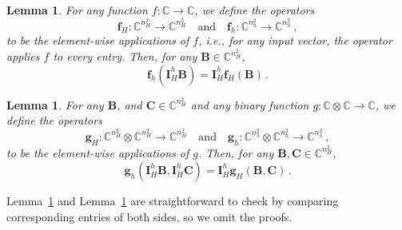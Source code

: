 \documentclass{article}
\numberwithin{equation}{section}
\newtheorem{lemma}[theorem]{Lemma}     %
\begin{document}
\begin{lemma}\label{lem:unary}
    For any function $f:\mathbb{C}\to\mathbb{C}$, we define the operators
\begin{equation*}
    \bm{f}_H:\mathbb{C}^{n_H^2}\to\mathbb{C}^{n_H^2}\quad\text{and}\quad \bm{f}_h:\mathbb{C}^{n_h^2}\to\mathbb{C}^{n_h^2}\,,
\end{equation*}
to be the element-wise applications of $f$, i.e., for any input vector, the operator applies $f$ to every entry. Then, for any $\bm{B}\in\mathbb{C}^{n_H^2}$,
\begin{equation*}
    \bm{f}_h\left(\bm{I}_H^h\bm{B}\right)= \bm{I}_H^h\bm{f}_H(\bm{B})\,.
\end{equation*}
\end{lemma}

\begin{lemma}\label{lem:binary}
    For any $\bm{B}$, and $\bm{C}\in\mathbb{C}^{n_H^2}$ and any binary function $g:\mathbb{C}\otimes\mathbb{C}\to\mathbb{C}$, we define the operators
\begin{equation*}
    \bm{g}_H:\mathbb{C}^{n_H^2}\otimes\mathbb{C}^{n_H^2}\to\mathbb{C}^{n_H^2}\quad\text{and}\quad \bm{g}_h:\mathbb{C}^{n_h^2}\otimes\mathbb{C}^{n_h^2}\to\mathbb{C}^{n_h^2}\,,
\end{equation*}
to be the element-wise applications of $g$. Then, for any $\bm{B},\bm{C}\in\mathbb{C}^{n_H^2}$,
\begin{equation*}
    \bm{g}_h\left(\bm{I}_H^h\bm{B},\bm{I}_H^h\bm{C}\right)= \bm{I}_H^h\bm{g}_H(\bm{B},\bm{C})\,.
\end{equation*}
\end{lemma}

Lemma~\ref{lem:unary} and Lemma~\ref{lem:binary} are straightforward to check by comparing corresponding entries of both sides, so we omit the proofs.
\end{document}
